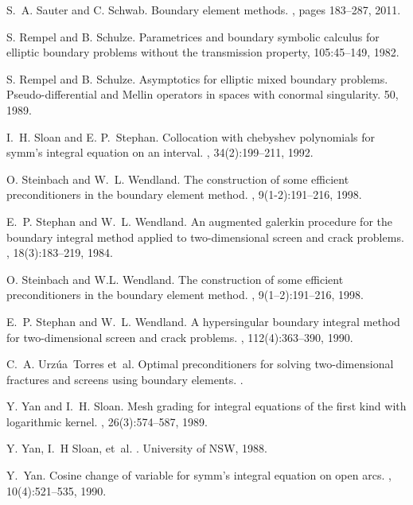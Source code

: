 \documentclass[a4paper]{subfiles}
\begin{document}
\begin{thebibliography}{10}
S.~A. Sauter and C. Schwab.
\newblock Boundary element methods.
, pages 183--287, 2011.

 S. Rempel and B. Schulze. \newblock Parametrices and boundary symbolic calculus for elliptic boundary problems without the transmission property,  105:45--149, 1982.

 S. Rempel and B. Schulze. Asymptotics for elliptic mixed boundary problems. Pseudo-differential and Mellin operators in spaces with conormal singularity.  50, 1989.

I.~H. Sloan and E. P.~Stephan.
\newblock Collocation with chebyshev polynomials for symm's integral equation
  on an interval.
, 34(2):199--211, 1992.

O. Steinbach and W.~L. Wendland.
\newblock The construction of some efficient preconditioners in the boundary
  element method.
, 9(1-2):191--216, 1998.

E.~P. Stephan and W.~L. Wendland.
\newblock An augmented galerkin procedure for the boundary integral method
  applied to two-dimensional screen and crack problems.
, 18(3):183--219, 1984.

{O.} Steinbach and {W.L.} Wendland.
\newblock The construction of some efficient preconditioners in the boundary
  element method.
, 9(1--2):191--216, 1998.

E.~P. Stephan and W.~L. Wendland.
\newblock A hypersingular boundary integral method for two-dimensional screen
  and crack problems.
, 112(4):363--390,
  1990.

C.~A. Urz{\'u}a~Torres et~al.
\newblock Optimal preconditioners for solving two-dimensional fractures and
  screens using boundary elements.
.

Y. Yan and I.~H. Sloan.
\newblock Mesh grading for integral equations of the first kind with
  logarithmic kernel.
, 26(3):574--587, 1989.

Y. Yan, I.~H Sloan, et~al.
.
\newblock University of NSW, 1988.

Y.~Yan.
\newblock Cosine change of variable for symm's integral equation on open arcs.
, 10(4):521--535, 1990.

\end{thebibliography}

	
	
\end{document}
